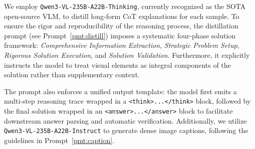 

We employ \texttt{Qwen3-VL-235B-A22B-Thinking}, currently recognized as the SOTA open-source VLM, to distill long-form CoT explanations for each sample.
To ensure the rigor and reproducibility of the reasoning process, the distillation prompt (see Prompt~\ref{pmt:distill}) imposes a systematic four-phase solution framework: \textit{Comprehensive Information Extraction}, \textit{Strategic Problem Setup}, \textit{Rigorous Solution Execution}, and \textit{Solution Validation}. Furthermore, it explicitly instructs the model to treat visual elements as integral components of the solution rather than supplementary context.

The prompt also enforces a unified output template: the model first emits a multi-step reasoning trace wrapped in a \verb|<think>...</think>| block, followed by the final solution wrapped in an \verb|<answer>...</answer>| block to facilitate downstream answer parsing and automatic verification. Additionally, we utilize \texttt{Qwen3-VL-235B-A22B-Instruct} to generate dense image captions, following the guidelines in Prompt~\ref{pmt:caption}.

